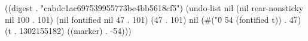 
((digest . "cabdc1ac697539955773be4bb5618cf5") (undo-list nil (nil rear-nonsticky nil 100 . 101) (nil fontified nil 47 . 101) (47 . 101) nil (#("\" 0 54 (fontified t)) . 47) (t . 1302155182) ((marker) . -54)))

